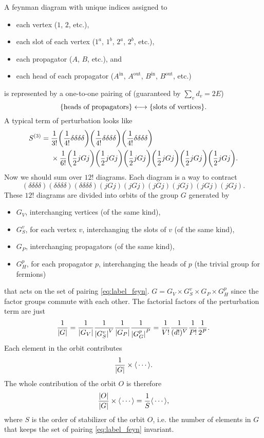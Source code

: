 \documentclass{article}
\begin{document}
A feynman diagram with unique indices assigned to
\begin{itemize}
    \item each vertex ($1$, $2$, etc.),
    \item each slot of each vertex ($1^a$, $1^b$, $2^a$, $2^b$, etc.),
    \item each propagator ($A$, $B$, etc.), and
    \item each head of each propagator ($A^{\text{in}}$, $A^{\text{out}}$, $B^{\text{in}}$, $B^{\text{out}}$, etc.)
\end{itemize}
is represented by a one-to-one pairing of (guaranteed by $\sum_v d_v = 2E$)
\begin{equation}
    \label{eq:label_feyn}
    \qty{\text{heads of propagators}} \longleftrightarrow \qty{\text{slots of vertices}}.
\end{equation}
A typical term of perturbation looks like
\begin{align}
    S^{(3)} &= \frac{1}{3!} \qty(\frac{1}{4!}\delta\delta\delta\delta)\qty(\frac{1}{4!}\delta\delta\delta\delta)\qty(\frac{1}{4!}\delta\delta\delta\delta) \label{eq:vertex_factor} \\ & \phantom{{}={}} \times  \frac{1}{6!}\qty(\frac{1}{2}jGj)\qty(\frac{1}{2}jGj)\qty(\frac{1}{2}jGj)\qty(\frac{1}{2}jGj)\qty(\frac{1}{2}jGj)\qty(\frac{1}{2}jGj). \label{eq:propagator_factor}
\end{align}
Now we should sum over $12!$ diagrams.
Each diagram is a way to contract
\[ (\delta\delta\delta\delta)(\delta\delta\delta\delta)(\delta\delta\delta\delta)(jGj)(jGj)(jGj)(jGj)(jGj)(jGj). \]
These $12!$ diagrams are divided into orbits of the group $G$ generated by
\begin{itemize}
    \item $G_V$, interchanging vertices (of the same kind),
    \item $G^v_S$, for each vertex $v$, interchanging the slots of $v$ (of the same kind),
    \item $G_P$, interchanging propagators (of the same kind),
    \item $G^p_H$, for each propagator $p$, interchanging the heads of $p$ (the trivial group for fermions)
\end{itemize}
that acts on the set of pairing \eqref{eq:label_feyn}.
$G = G_V \times G^v_S \times G_P \times G^p_H$ since the factor groups commute with each other.
The factorial factors of the perturbation term are just
\[ \frac{1}{\abs{G}} = \frac{1}{\abs{G_V}} \frac{1}{\abs{{G^v_S}}^V} \frac{1}{\abs{G_P}} \frac{1}{\abs{G^p_G}^P} = \frac{1}{V!} \frac{1}{(d!)^V} \frac{1}{P!} \frac{1}{2^P}. \]
Each element in the orbit contributes
\[ \frac{1}{\abs{G}}\times \langle {}\cdots \rangle. \]
The whole contribution of the orbit $O$ is therefore
\[ \frac{\abs{O}}{\abs{G}}\times \langle {}\cdots \rangle = \frac{1}{S}\langle {}\cdots \rangle, \]
where $S$ is the order of stabilizer of the orbit $O$, i.e. the number of elements in $G$ that keeps the set of pairing \eqref{eq:label_feyn} invariant.
\end{document}
